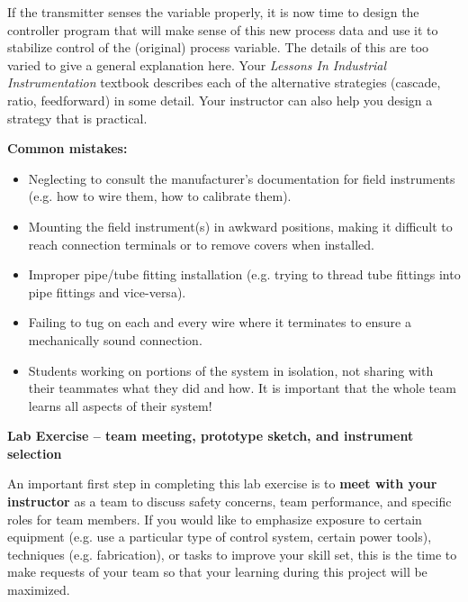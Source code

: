 \documentclass[12pt,a4paper]{article}
\begin{document}
If the transmitter senses the variable properly, it is now time to design the controller program that will make sense of this new process data and use it to stabilize control of the (original) process variable.  The details of this are too varied to give a general explanation here.  Your {\it Lessons In Industrial Instrumentation} textbook describes each of the alternative strategies (cascade, ratio, feedforward) in some detail.  Your instructor can also help you design a strategy that is practical.

\vskip 10pt

{\bf Common mistakes:}

\begin{itemize}
\item{} Neglecting to consult the manufacturer's documentation for field instruments (e.g. how to wire them, how to calibrate them).
\item{} Mounting the field instrument(s) in awkward positions, making it difficult to reach connection terminals or to remove covers when installed.
\item{} Improper pipe/tube fitting installation (e.g. trying to thread tube fittings into pipe fittings and vice-versa).
\item{} Failing to tug on each and every wire where it terminates to ensure a mechanically sound connection.
\item{} Students working on portions of the system in isolation, not sharing with their teammates what they did and how.  It is important that the whole team learns all aspects of their system!
\end{itemize}






\vfil \eject

\noindent
{\bf Lab Exercise -- team meeting, prototype sketch, and instrument selection}

\vskip 5pt

An important first step in completing this lab exercise is to {\bf meet with your instructor} as a team to discuss safety concerns, team performance, and specific roles for team members.  If you would like to emphasize exposure to certain equipment (e.g. use a particular type of control system, certain power tools), techniques (e.g. fabrication), or tasks to improve your skill set, this is the time to make requests of your team so that your learning during this project will be maximized.

\vskip 10pt
\end{document}
